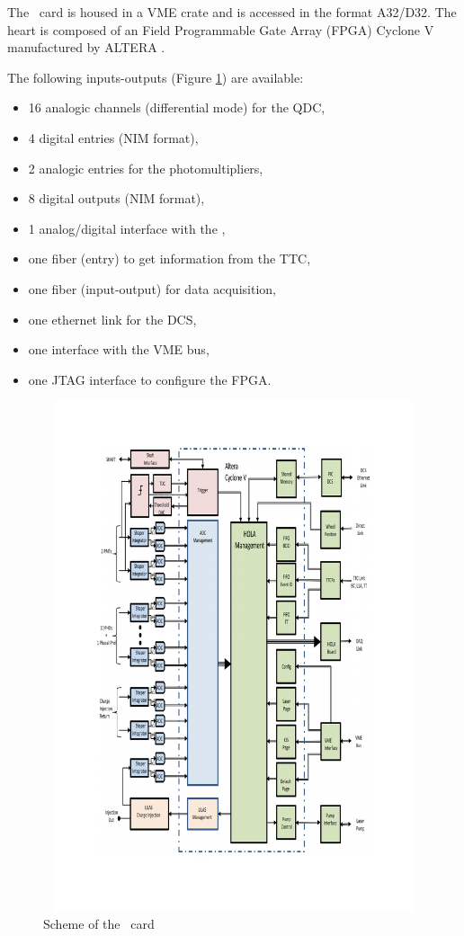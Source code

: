The \lascar~card is housed in a VME crate and is accessed in the format A32/D32. The heart is composed of an Field Programmable Gate Array (FPGA) Cyclone V manufactured by ALTERA \cite{ref:altera-cyclone}.

The following inputs-outputs (Figure \ref{fig:laslascarlinks}) are available:
\begin{itemize}
\item 16 analogic channels (differential mode) for the QDC,
\item 4 digital entries (NIM format),
\item 2 analogic entries for the photomultipliers,
\item 8 digital outputs (NIM format),
\item 1 analog/digital interface with the \las,
\item one fiber (entry) to get information from the TTC,
\item one fiber (input-output) for data acquisition,
\item one ethernet link for the DCS,
\item one interface with the VME bus,
\item one JTAG interface to configure the FPGA.

\end{itemize}

\begin{figure}[htbp]

\centering
\includegraphics[height=15cm,width=15cm]{figures/Lascarlinks.pdf}
\caption{Scheme of the \lascar~card}\label{fig:laslascarlinks}
\end{figure}


